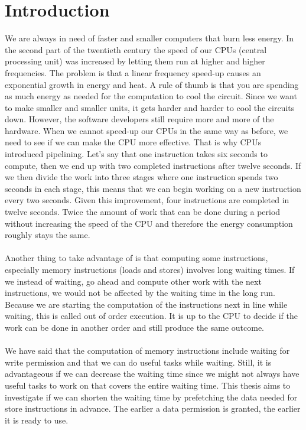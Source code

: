 \chapter{Introduction}
\label{chap:In}
We are always in need of faster and smaller computers that burn less energy. In
the second part of the twentieth century the speed of our CPUs (central processing unit)
was increased by letting them run at higher and higher frequencies. The problem is that a linear
frequency speed-up causes an exponential growth in energy and heat. A rule of thumb
is that you are spending as much energy as needed for the computation to cool the
circuit. Since we want to make smaller and smaller units, it gets harder and harder
to cool the circuits down. However, the software developers still
require more and more of the hardware. When we cannot speed-up our CPUs
in the same way as before, we need to see if we can make the CPU more effective. That is why
CPUs introduced pipelining. Let's say that one instruction takes six seconds to compute, then we end up with two completed instructions after twelve seconds. If we then divide
the work into three stages where one instruction spends two seconds in each stage, this means
that we can begin working on a new instruction every two  seconds. Given this improvement, four instructions are completed in twelve seconds.
Twice the amount of work that can be done during a period without increasing the speed
of the CPU and therefore the energy consumption roughly stays the same.
\\ \\
Another thing to take advantage of is that computing some instructions, especially
memory instructions (loads and stores) involves long waiting times. If we instead of waiting, go ahead and compute other work with the next instructions, we would not be affected by the waiting time in the long run. Because we are starting the computation of the instructions next in line while waiting, this is called out of order execution. It is up to the CPU to decide if the work can be done in another order and still produce the same outcome. 
\\ \\
We have said that the computation of memory instructions include waiting for write permission and that we can do useful tasks while waiting. Still, it is advantageous if we can decrease the waiting time since we might not always have useful tasks to work on that covers the entire waiting time. This thesis aims to investigate if we can shorten the waiting time by prefetching the data needed for store instructions in advance. The earlier a data permission is granted, the earlier it is ready to use.
